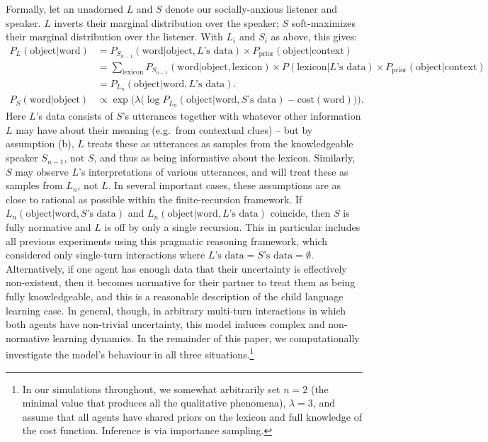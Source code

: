 \documentclass{article} %
\newcommand{\word}{\text{word}}
\newcommand{\obj}{\text{object}}
\newcommand{\lex}{\text{lexicon}}
\newcommand{\prior}{P_{\text{prior}}(\obj | \text{context})}
\begin{document}
Formally, let an unadorned $L$ and $S$ denote our socially-anxious listener and speaker. $L$ inverts their marginal distribution over the speaker; $S$ soft-maximizes their marginal distribution over the listener. With $L_i$ and $S_i$ as above, this gives:
\begin{align*}
  P_L(\obj | \word) &= P_{S_{n-1}}(\word | \obj, \text{$L$'s data}) \times \prior \\
    &= \sum_\lex P_{S_{n-1}}(\word | \obj, \lex) \times P(\lex | \text{$L$'s data}) \times \prior \\
    &= P_{L_n}(\obj | \word, \text{$L$'s data}). \\
  P_S(\word | \obj) &\propto \exp\Big(\lambda \big(\log P_{L_n}(\obj | \word, \text{$S$'s data}) - \text{cost}(\word)\big)\Big).
\end{align*}
Here $L$'s data consists of $S$'s utterances together with whatever other information $L$ may have about their meaning (e.g.~from contextual clues) -- but by assumption (b), $L$ treats these as utterances as samples from the knowledgeable speaker $S_{n-1}$, not $S$, and thus as being informative about the lexicon. Similarly, $S$ may observe $L$'s interpretations of various utterances, and will treat these as samples from $L_n$, not $L$.
In several important cases, these assumptions are as close to rational as possible within the finite-recursion framework. If $L_n(\obj | \word, \text{$S$'s data})$ and $L_n(\obj | \word, \text{$L$'s data})$ coincide, then  $S$ is fully normative and $L$ is off by only a single recursion. This in particular includes all previous experiments using this pragmatic reasoning framework, which considered only single-turn interactions where $\text{$L$'s data} = \text{$S$'s data} = \emptyset$. Alternatively, if one agent has enough data that their uncertainty is effectively non-existent, then it becomes normative for their partner to treat them as being fully knowledgeable, and this is a reasonable description of the child language learning case. In general, though, in arbitrary multi-turn interactions in which both agents have non-trivial uncertainty, this model induces complex and non-normative learning dynamics. In the remainder of this paper, we computationally investigate the model's behaviour in all three situations.\footnote{In our simulations throughout, we somewhat arbitrarily set $n = 2$ (the minimal value that produces all the qualitative phenomena), $\lambda = 3$, and assume that all agents have shared priors on the lexicon and full knowledge of the cost function. Inference is via importance sampling.}
\end{document}
